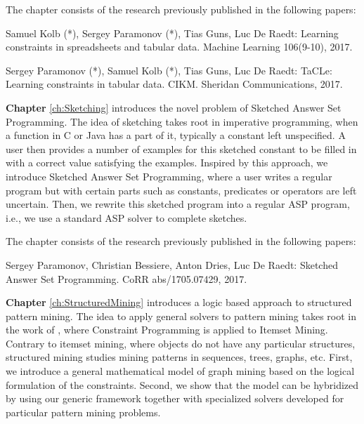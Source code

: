 The chapter consists of the research previously published in the following papers:

\begin{addmargin}[2em]{2em}
Samuel Kolb (*), Sergey Paramonov (*), Tias Guns, Luc De Raedt:
  Learning constraints in spreadsheets and tabular data. Machine
  Learning 106(9-10), 2017.


Sergey Paramonov (*), Samuel Kolb (*), Tias Guns, Luc De Raedt:
TaCLe: Learning constraints in tabular data. CIKM. Sheridan
Communications, 2017.
\end{addmargin}


\textbf{Chapter} \ref{ch:Sketching} introduces the novel problem of
Sketched Answer Set Programming. The idea of sketching takes root in
imperative programming, when a function in C or Java has a part of it,
typically a constant left unspecified. A user then provides a number
of examples for this sketched constant to be filled in with a
correct value satisfying the examples. Inspired by this approach, we
introduce Sketched Answer Set Programming, where a user writes a
regular program but with certain parts such as constants, predicates
or operators are left uncertain. Then, we rewrite this sketched
program into a regular ASP program, i.e., we use a standard ASP solver
to complete sketches.


The chapter consists of the research previously published in the following papers:
\begin{addmargin}[2em]{2em}
  Sergey Paramonov, Christian Bessiere, Anton Dries, Luc De Raedt:
  Sketched Answer Set Programming. CoRR abs/1705.07429, 2017.
\end{addmargin}


\textbf{Chapter} \ref{ch:StructuredMining} introduces a logic
based approach to structured pattern mining. The idea to apply general
solvers to pattern mining takes root in the work of
\cite{declrativeapproach}, where Constraint Programming is applied to
Itemset Mining. Contrary to itemset mining, where objects do not have
any particular structures, structured mining studies mining patterns
in sequences, trees, graphs, etc. First, we introduce a general
mathematical model of graph mining based on the logical formulation of
the constraints. Second, we show that the model can be hybridized by
using our generic framework together with specialized solvers
developed for particular pattern mining problems.

